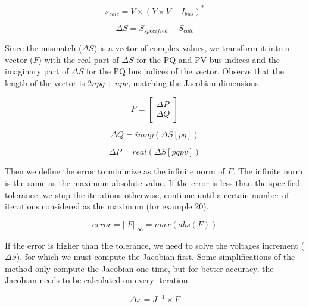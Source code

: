 \documentclass[a4paper,twoside]{tufte-book}
\begin{document}
\begin{equation}
s_{calc} = V \times (Y \times V - I_{bus})^*
\label{eq:nr_Scalc}
\end{equation}

\begin{equation}
\Delta S = S_{specified} - S_{calc} 
\end{equation}


Since the mismatch ($\Delta S$) is a vector of complex values, we transform it into a vector ($F$) with the real part of $\Delta S$ for the PQ and PV bus indices and the imaginary part of $\Delta S$ for the PQ bus indices of the vector. Observe that the length of the vector is $2npq+npv$, matching the Jacobian dimensions.



\begin{equation}
F =  \left[
\begin{array}{c}
\Delta P \\
\Delta Q  
\end{array}
\right]
\label{eq:nr_mismatch}
\end{equation}

\begin{equation}
\Delta Q = imag(\Delta S[pq]) 
\label{eq:nr_q_inc}
\end{equation}

\begin{equation}
\Delta P = real(\Delta S[pqpv])
\label{eq:nr_p_inc}
\end{equation}

Then we define the error to minimize as the infinite norm of $F$. The infinite norm is the same as the maximum absolute value. If the error is less than the specified tolerance, we stop the iterations otherwise, continue until a certain number of iterations considered as the maximum (for example 20).

\begin{equation}
error = ||F||_{\infty} = max(abs(F))
\label{eq:nr_error}
\end{equation}

If the error is higher than the tolerance, we need to solve the voltages increment ($\Delta x$), for which we must compute the Jacobian first. Some simplifications of the method only compute the Jacobian one time, but for better accuracy, the Jacobian needs to be calculated on every iteration.

\begin{equation}
\Delta x = J^{-1} \times F
\label{eq:nr_solve}
\end{equation}
\end{document}
